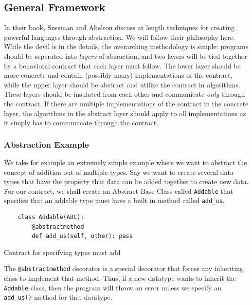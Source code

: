 \documentclass[letterpaper, 10 pt, conference]{ieeeconf}  %
\begin{document}
\subsection{General Framework}

In their book, Sussman and Abelson \cite{sicp} discuss at length techniques for creating powerful languages through abstraction.
We will follow their philosophy here.
While the devil is in the details, the overarching methodology is simple: programs should be seperated into \emph{layers} of absraction, and two layers will be tied together by a behavioral contract that each layer must follow. The lower layer should be more concrete and contain (possibly many) implementations of the contract, while the upper layer should be abstract and utilize the contract in algorithms.
These layers should be insulated from each other and communicate \emph{only} through the contract.
If there are multiple implementations of the contract in the concrete layer, the algorithms in the abstract layer should apply to all implementations as it simply has to communicate through the contract.

\subsubsection{Abstraction Example}

We take for example an extremely simple example where we want to abstract the concept of addition out of multiple types.
Say we want to create several data types that have the property that data can be added together to create new data.
For our contract, we shall create an Abstract Base Class called \texttt{Addable} that specifies that an addable type must have a built in method called \texttt{add\_us}.

\begin{listing}
\begin{verbatim}
	class Addable(ABC):
		@abstractmethod
		def add_us(self, other): pass
\end{verbatim}
    \caption{Contract for specifying types must add}
\label{listing:1}
\end{listing}

The \texttt{@abstractmethod} decorator is a special decorator that forces any inheriting class to implement that method.
Thus, if a new datatype wants to inherit the \texttt{Addable} class, then the program will throw an error unless we specify an \texttt{add\_us()} method for that datatype.
\end{document}
